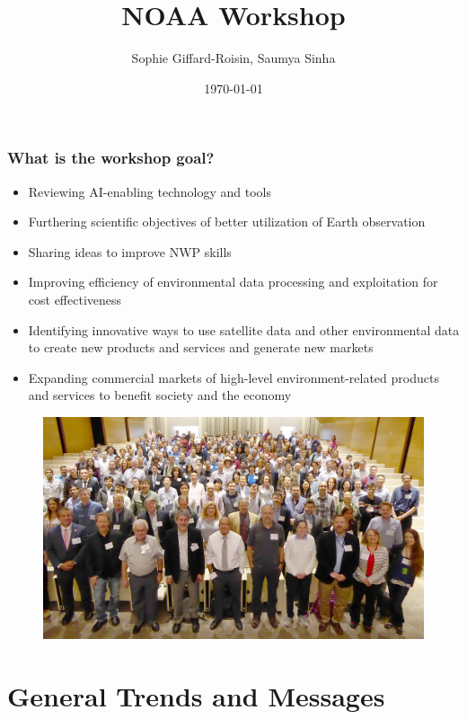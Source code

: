 \documentclass{beamer}
\title[NOAA workshop (Washington DC): Leveraging AI in the expoloitation of Satellite Earth Observations \& numerical weather prediction] %
{NOAA Workshop}
\author{Sophie Giffard-Roisin, Saumya Sinha}
\institute[CU] %
{
	
}
\date{\today} %
\begin{document}
\begin{frame}
\titlepage %
\end{frame}

\begin{frame}
\frametitle{What is the workshop goal?}
\begin{itemize}
\footnotesize
    \item Reviewing AI-enabling technology and tools
    \item Furthering scientific objectives of better utilization of Earth observation
    \item Sharing ideas to improve NWP skills
    \item Improving efficiency of environmental data processing and exploitation for cost effectiveness
    \item Identifying innovative ways to use satellite data and other environmental data to create new products and services and generate new markets
    \item Expanding commercial markets of high-level environment-related products and services to benefit society and the economy

\end{itemize}
\begin{figure}
	\includegraphics[width=0.45\linewidth]{figs/AIWkshp2019_grouppic_1000x582.jpg}
\end{figure}
\end{frame}


\section{General Trends and Messages}
\end{document}

